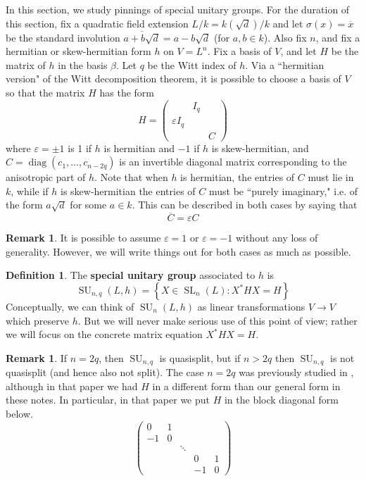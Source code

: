 \documentclass[12pt]{article}
\theoremstyle{definition}
\newtheorem{definition}[theorem]{Definition}
\newtheorem{remark}[theorem]{Remark}
\numberwithin{theorem}{subsection}
\newcommand{\sig}{\sigma}
\newcommand{\eps}{\varepsilon}
\newcommand{\lb}{\left\{}
\newcommand{\rb}{\right\}}
\newcommand{\tbf}{\textbf}
\newcommand{\ov}{\overline}
\DeclareMathOperator{\SL}{SL}
\DeclareMathOperator{\SU}{SU}
\DeclareMathOperator{\diag}{diag}
\begin{document}
In this section, we study pinnings of special unitary groups. For the duration of this section, fix a quadratic field extension $L/k = k(\sqrt{d})/k$ and let $\sig(x) = \ov x$ be the standard involution $\ov{a+b \sqrt{d}} = a-b \sqrt{d}$ (for $a,b \in k$). Also fix $n$, and fix a hermitian or skew-hermitian form $h$ on $V = L^{n}$. Fix a basis of $V$, and let $H$ be the matrix of $h$ in the basis $\beta$. Let $q$ be the Witt index of $h$. Via a ``hermitian version" of the Witt decomposition theorem, it is possible to choose a basis of $V$ so that the matrix $H$ has the form
\[
	H =
	\begin{pmatrix}
		& I_q \\
		\eps I_q \\
		&& C
	\end{pmatrix}
\]
where $\eps = \pm 1$ is 1 if $h$ is hermitian and $-1$ if $h$ is skew-hermitian, and $C = \diag(c_1, \ldots, c_{n-2q})$ is an invertible diagonal matrix corresponding to the anisotropic part of $h$. Note that when $h$ is hermitian, the entries of $C$ must lie in $k$, while if $h$ is skew-hermitian the entries of $C$ must be ``purely imaginary," i.e. of the form $a \sqrt{d}$ for some $a \in k$. This can be described in both cases by saying that
\[
	\ov C = \eps C
\]

\begin{remark}
It is possible to assume $\eps = 1$ or $\eps = -1$ without any loss of generality. However, we will write things out for both cases as much as possible.
\end{remark}

\begin{definition}
The \tbf{special unitary group} associated to $h$ is
\[
	\SU_{n,q}(L,h) = \lb X \in \SL_{n}(L) : X^*H X = H \rb
\]
Conceptually, we can think of $\SU_{n}(L,h)$ as linear transformations $V \to V$ which preserve $h$. But we will never make serious use of this point of view; rather we will focus on the concrete matrix equation $X^*HX = H$.
\end{definition}

\begin{remark}
If $n=2q$, then $\SU_{n,q}$ is quasisplit, but if $n > 2q$ then $\SU_{n,q}$ is not quasisplit (and hence also not split). The case $n=2q$ was previously studied in \cite{Rapinchuk-Ruiter}, although in that paper we had $H$ in a different form than our general form in these notes. In particular, in that paper we put $H$ in the block diagonal form below.
\[
	\begin{pmatrix}
		0 & 1 \\
		-1 & 0 \\
		&& \ddots \\
		&&& 0 & 1 \\
		&&& -1 & 0
	\end{pmatrix}
\]
\end{remark}
\end{document}
